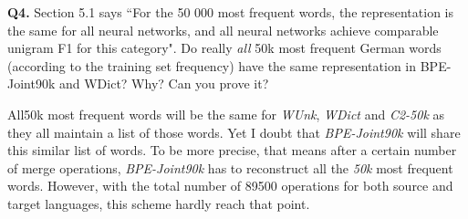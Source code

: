 \documentclass{article}
\begin{document}
\bigskip

\textbf{Q4.} Section 5.1 says ``For the 50 000 most frequent words, the representation is the same for all neural networks, and all neural networks achieve comparable unigram F1 for this category". Do really \textit{all} 50k most frequent German words (according to the training set frequency) have the same representation in BPE-Joint90k and WDict? Why? Can you prove it?

All50k most frequent words will be the same for \textit{WUnk}, \textit{WDict} and \textit{C2-50k} as they all maintain a list of those words. Yet I doubt that \textit{BPE-Joint90k} will share this similar list of words. To be more precise, that means after a certain number of merge operations, \textit{BPE-Joint90k} has to reconstruct all the \textit{50k} most frequent words. However, with the total number of 89500 operations for both source and target languages, this scheme hardly reach that point.
\end{document}
